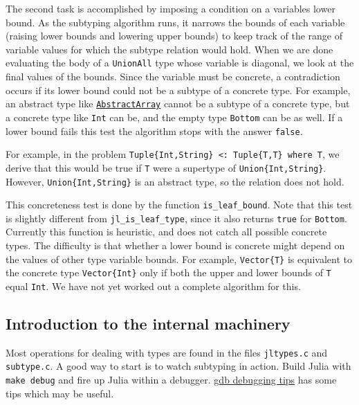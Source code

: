 The second task is accomplished by imposing a condition on a variable{\textquotesingle}s lower bound. As the subtyping algorithm runs, it narrows the bounds of each variable (raising lower bounds and lowering upper bounds) to keep track of the range of variable values for which the subtype relation would hold. When we are done evaluating the body of a \texttt{UnionAll} type whose variable is diagonal, we look at the final values of the bounds. Since the variable must be concrete, a contradiction occurs if its lower bound could not be a subtype of a concrete type. For example, an abstract type like \hyperlink{6514416309183787338}{\texttt{AbstractArray}} cannot be a subtype of a concrete type, but a concrete type like \texttt{Int} can be, and the empty type \texttt{Bottom} can be as well. If a lower bound fails this test the algorithm stops with the answer \texttt{false}.



For example, in the problem \texttt{Tuple\{Int,String\} <: Tuple\{T,T\} where T}, we derive that this would be true if \texttt{T} were a supertype of \texttt{Union\{Int,String\}}. However, \texttt{Union\{Int,String\}} is an abstract type, so the relation does not hold.



This concreteness test is done by the function \texttt{is\_leaf\_bound}. Note that this test is slightly different from \texttt{jl\_is\_leaf\_type}, since it also returns \texttt{true} for \texttt{Bottom}. Currently this function is heuristic, and does not catch all possible concrete types. The difficulty is that whether a lower bound is concrete might depend on the values of other type variable bounds. For example, \texttt{Vector\{T\}} is equivalent to the concrete type \texttt{Vector\{Int\}} only if both the upper and lower bounds of \texttt{T} equal \texttt{Int}. We have not yet worked out a complete algorithm for this.



\hypertarget{37604590457653524}{}


\subsection{Introduction to the internal machinery}



Most operations for dealing with types are found in the files \texttt{jltypes.c} and \texttt{subtype.c}. A good way to start is to watch subtyping in action. Build Julia with \texttt{make debug} and fire up Julia within a debugger. \hyperlink{6515020785971536083}{gdb debugging tips} has some tips which may be useful.




